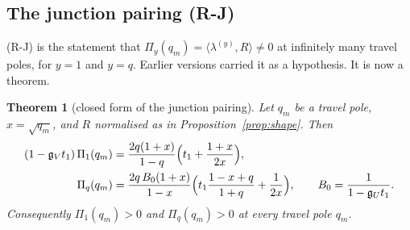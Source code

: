 \documentclass[11pt]{article}
\theoremstyle{plain}
\newtheorem{theorem}{Theorem}
\theoremstyle{definition}
\theoremstyle{remark}
\begin{document}
\subsection{The junction pairing \textup{(R-J)}}\label{sec:RJ}

\textup{(R-J)} is the statement that $\Pi_y(q_m)=\langle\lambda^{(y)},R\rangle\ne0$ at infinitely
many travel poles, for $y=1$ and $y=q$. Earlier versions carried it as a hypothesis. It is now a
theorem.

\begin{theorem}[closed form of the junction pairing]\label{thm:RJ}
Let $q_m$ be a travel pole, $x=\sqrt{q_m}$, and $R$ normalised as in
Proposition~\ref{prop:shape}. Then
\begin{align}
   (1-\mathfrak g_Vt_1)\,\Pi_1(q_m)
     &=\frac{2q(1+x)}{1-q}\Bigl(t_1+\frac{1+x}{2x}\Bigr),\label{eq:RJclosed1}\\
   \Pi_q(q_m)
     &=\frac{2q\,B_0(1+x)}{1-x}\Bigl(t_1\frac{1-x+q}{1+q}+\frac1{2x}\Bigr),
     \qquad B_0=\frac1{1-\mathfrak g_Ut_1}. \label{eq:RJclosedq}
\end{align}
Consequently $\Pi_1(q_m)>0$ and $\Pi_q(q_m)>0$ at every travel pole $q_m$.
\end{theorem}
\end{document}
